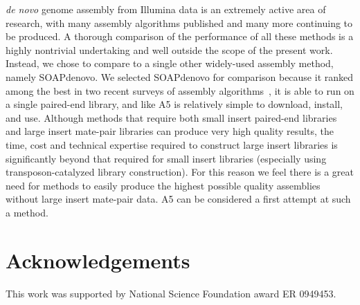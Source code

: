 \documentclass{bioinfo}
\begin{document}
\emph{de novo} genome assembly from Illumina data is an extremely active area of research, with many assembly algorithms published and many more continuing to be produced.
A thorough comparison of the performance of all these methods is a highly nontrivial undertaking and well outside the scope of the present  
work. Instead, we chose to compare to a single other widely-used assembly method, namely SOAPdenovo. We selected SOAPdenovo for comparison
because it ranked among the best in two recent surveys of assembly algorithms~\citep{Assemblathon,GAGE}, it is able to run on a single paired-end
library, and like A5 is relatively simple to download, install, and use. Although methods that require both small insert paired-end libraries
and large insert mate-pair libraries can produce very high quality results, the time, cost and technical expertise required to construct large insert
libraries is significantly beyond that required for small insert libraries (especially using transposon-catalyzed library construction).
For this reason we feel there is a great need for methods to easily produce the highest possible quality assemblies without large insert mate-pair data.
A5 can be considered a first attempt at such a method.

\section*{Acknowledgements}
This work was supported by National Science Foundation award ER 0949453.





\end{document}

